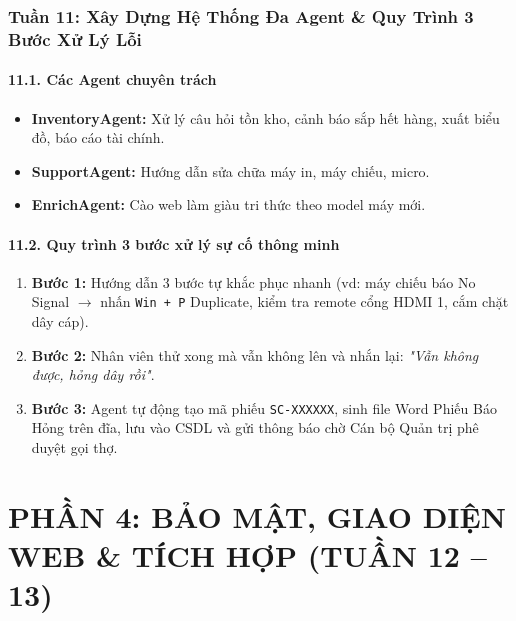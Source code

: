 \documentclass[11pt,a4paper]{article}
\begin{document}
\section{Tuần 11: Xây Dựng Hệ Thống Đa Agent \& Quy Trình 3 Bước Xử Lý Lỗi}

\subsection{11.1. Các Agent chuyên trách}
\begin{itemize}
    \item \textbf{InventoryAgent:} Xử lý câu hỏi tồn kho, cảnh báo sắp hết hàng, xuất biểu đồ, báo cáo tài chính.
    \item \textbf{SupportAgent:} Hướng dẫn sửa chữa máy in, máy chiếu, micro.
    \item \textbf{EnrichAgent:} Cào web làm giàu tri thức theo model máy mới.
\end{itemize}

\subsection{11.2. Quy trình 3 bước xử lý sự cố thông minh}
\begin{enumerate}
    \item \textbf{Bước 1:} Hướng dẫn 3 bước tự khắc phục nhanh (vd: máy chiếu báo No Signal $\rightarrow$ nhấn \texttt{Win + P} Duplicate, kiểm tra remote cổng HDMI 1, cắm chặt dây cáp).
    \item \textbf{Bước 2:} Nhân viên thử xong mà vẫn không lên và nhắn lại: \textit{"Vẫn không được, hỏng dây rồi"}.
    \item \textbf{Bước 3:} Agent tự động tạo mã phiếu \texttt{SC-XXXXXX}, sinh file Word Phiếu Báo Hỏng trên đĩa, lưu vào CSDL và gửi thông báo chờ Cán bộ Quản trị phê duyệt gọi thợ.
\end{enumerate}

\newpage

\part*{\Large \color{blue!85!black} PHẦN 4: BẢO MẬT, GIAO DIỆN WEB \& TÍCH HỢP (TUẦN 12 -- 13)}
\end{document}
